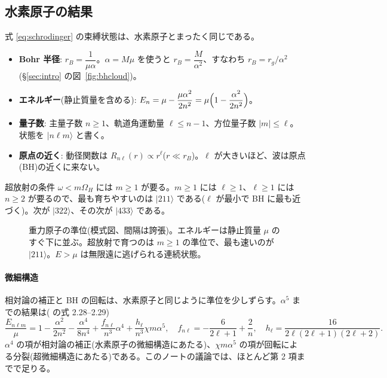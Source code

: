\subsection{水素原子の結果}

式 \eqref{eq:schrodinger} の束縛状態は、水素原子とまったく同じである。
\begin{itemize}
\item \textbf{Bohr 半径}: $r_B=\dfrac{1}{\mu\alpha}$。$\alpha=M\mu$ を使うと $r_B=\dfrac{M}{\alpha^2}$、すなわち $r_B=r_g/\alpha^2$(\S\ref{sec:intro} の図~\ref{fig:bhcloud})。
\item \textbf{エネルギー}(静止質量を含める): $E_n=\mu-\dfrac{\mu\alpha^2}{2n^2}=\mu\Bigl(1-\dfrac{\alpha^2}{2n^2}\Bigr)$。
\item \textbf{量子数}: 主量子数 $n\ge1$、軌道角運動量 $\ell\le n-1$、方位量子数 $|m|\le\ell$。状態を $|n\ell m\rangle$ と書く。
\item \textbf{原点の近く}: 動径関数は $R_{n\ell}(r)\propto r^\ell$($r\ll r_B$)。$\ell$ が大きいほど、波は原点(BH)の近くに来ない。
\end{itemize}
超放射の条件 $\omega<m\Omega_H$ には $m\ge1$ が要る。$m\ge1$ には $\ell\ge1$、$\ell\ge1$ には $n\ge2$ が要るので、最も育ちやすいのは $|211\rangle$ である($\ell$ が最小で BH に最も近づく)。次が $|322\rangle$、その次が $|433\rangle$ である。

\begin{figure}[H]
\centering

\caption{重力原子の準位(模式図、間隔は誇張)。エネルギーは静止質量 $\mu$ のすぐ下に並ぶ。超放射で育つのは $m\ge1$ の準位で、最も速いのが $|211\rangle$。$E>\mu$ は無限遠に逃げられる連続状態。}
\label{fig:levels}
\end{figure}

\paragraph{微細構造}
相対論の補正と BH の回転は、水素原子と同じように準位を少しずらす。$\alpha^5$ までの結果は( の式 2.28--2.29)
\begin{equation}
\frac{E_{n\ell m}}{\mu}=1-\frac{\alpha^2}{2n^2}-\frac{\alpha^4}{8n^4}+\frac{f_{n\ell}}{n^3}\alpha^4+\frac{h_\ell}{n^3}\chi m\alpha^5,
\quad f_{n\ell}=-\frac{6}{2\ell+1}+\frac{2}{n},\quad h_\ell=\frac{16}{2\ell(2\ell+1)(2\ell+2)}.
\label{eq:fine}
\end{equation}
$\alpha^4$ の項が相対論の補正(水素原子の微細構造にあたる)、$\chi m\alpha^5$ の項が回転による分裂(超微細構造にあたる)である。このノートの議論では、ほとんど第 2 項までで足りる。

